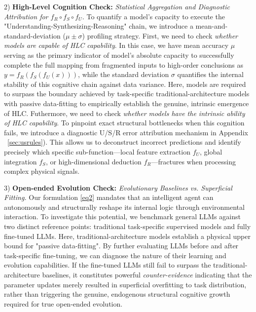 2) \textbf{High-Level Cognition Check:} \emph{Statistical Aggregation and Diagnostic Attribution for $f_R \circ f_S \circ f_U$.} 
To quantify a model's capacity to execute the "Understanding-Synthesizing-Reasoning" chain, we introduce a mean-and-standard-deviation ($\mu \pm \sigma$) profiling strategy. 
First, we need to check \emph{whether models are capable of HLC capability}.
In this case, we have mean accuracy $\mu$ serving as the primary indicator of model's absolute capacity to successfully complete the full mapping from fragmented inputs to high-order conclusions as $y = f_R(f_S(f_U(x)))$, while the standard deviation $\sigma$ quantifies the internal stability of this cognitive chain against data variance. 
Here, models are required to surpass the boundary achieved by task-specific traditional-architecture models with passive data-fitting to empirically establish the genuine, intrinsic emergence of HLC.
Futhermore, we need to check \emph{whether models have the intrinsic ability of HLC capability}.
To pinpoint exact structural bottlenecks when this cognition fails, we introduce a diagnostic U/S/R error attribution mechanism in Appendix ~\ref{sec:usrules}). 
This allows us to deconstruct incorrect predictions and identify precisely which specific sub-function—local feature extraction $f_U$, global integration $f_S$, or high-dimensional deduction $f_R$—fractures when processing complex physical signals.

3) \textbf{Open-ended Evolution Check:} \emph{Evolutionary Baselines vs. Superficial Fitting.} 
Our formulation \ref{eq2} mandates that an intelligent agent can autonomously and structurally reshape its internal logic through environmental interaction. 
To investigate this potential, we benchmark general LLMs against two distinct reference points: traditional task-specific supervised models and fully fine-tuned LLMs. 
Here, traditional-architecture models establish a physical upper bound for "passive data-fitting". 
By further evaluating LLMs before and after task-specific fine-tuning, we can diagnose the nature of their learning and evolution capabilities. 
If the fine-tuned LLMs still fail to surpass the traditional-architecture baselines, it constitutes powerful \emph{counter-evidence} indicating that the parameter updates merely resulted in superficial overfitting to task distribution, rather than triggering the genuine, endogenous structural cognitive growth required for true open-ended evolution.


